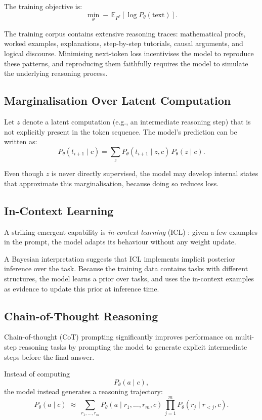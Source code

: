 \documentclass[11pt,a4paper]{article}
\theoremstyle{definition}
\theoremstyle{plain}
\newcommand{\E}{\mathbb{E}}
\begin{document}
The training objective is:
\[
  \min_\theta -\,\E_{P^*}\!\left[\log P_\theta(\text{text})\right].
\]

The training corpus contains extensive reasoning traces:
mathematical proofs, worked examples, explanations, step-by-step tutorials,
causal arguments, and logical discourse.
Minimising next-token loss incentivises the model to reproduce these patterns,
and reproducing them faithfully requires the model to simulate the underlying
reasoning process.

\subsection{Marginalisation Over Latent Computation}

Let $z$ denote a latent computation (e.g., an intermediate reasoning step)
that is not explicitly present in the token sequence.
The model's prediction can be written as:
\[
  P_\theta(t_{i+1} \mid c)
  = \sum_{z} P_\theta(t_{i+1} \mid z, c)\,P_\theta(z \mid c).
\]

Even though $z$ is never directly supervised, the model may develop internal
states that approximate this marginalisation, because doing so reduces loss.

\subsection{In-Context Learning}

A striking emergent capability is \emph{in-context learning} (ICL)
\cite{brown2020gpt3}: given a few examples in the prompt, the model adapts
its behaviour without any weight update.

A Bayesian interpretation \cite{xie2021explanation} suggests that ICL implements
implicit posterior inference over the task.
Because the training data contains tasks with different structures, the model
learns a prior over tasks, and uses the in-context examples as evidence to
update this prior at inference time.

\subsection{Chain-of-Thought Reasoning}

Chain-of-thought (CoT) prompting \cite{wei2022cot} significantly improves
performance on multi-step reasoning tasks by prompting the model to generate
explicit intermediate steps before the final answer.

Instead of computing
\[
  P_\theta(a \mid c),
\]
the model instead generates a reasoning trajectory:
\[
  P_\theta(a \mid c)
  \;\approx\;
  \sum_{r_1, \dots, r_m}
  P_\theta(a \mid r_1, \dots, r_m, c)\,
  \prod_{j=1}^{m} P_\theta(r_j \mid r_{<j}, c).
\]
\end{document}
